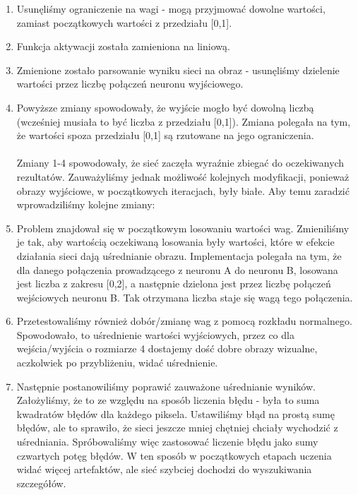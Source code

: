 \documentclass[12pt,a4paper,oneside]{article}
\begin{document}
\begin{enumerate}
\item Usunęliśmy ograniczenie na wagi - mogą przyjmować dowolne wartości, zamiast początkowych wartości z przedziału [0,1]. 
\item Funkcja aktywacji została zamieniona na liniową. 
\item Zmienione zostało parsowanie wyniku sieci na obraz - usunęliśmy dzielenie wartości przez liczbę połączeń neuronu wyjściowego.
\item Powyższe zmiany spowodowały, że wyjście mogło być dowolną liczbą (wcześniej musiała to być liczba z przedziału [0,1]). Zmiana polegała na tym, że wartości spoza przedziału [0,1] są rzutowane na jego ograniczenia.
\\ \\
Zmiany 1-4 spowodowały, że sieć zaczęła wyraźnie zbiegać do oczekiwanych rezultatów. Zauważyliśmy jednak możliwość kolejnych modyfikacji, ponieważ obrazy wyjściowe, w początkowych iteracjach, były białe. Aby temu zaradzić wprowadziliśmy kolejne zmiany:
\\
\item Problem znajdował się w początkowym losowaniu wartości wag. Zmieniliśmy je tak, aby wartością oczekiwaną losowania były wartości, które w efekcie działania sieci dają uśrednianie obrazu. Implementacja polegała na tym, że dla danego połączenia prowadzącego z neuronu A do neuronu B, losowana jest liczba z zakresu [0,2], a następnie dzielona jest przez liczbę połączeń wejściowych neuronu B. Tak otrzymana liczba staje się wagą tego połączenia.

\item Przetestowaliśmy również dobór/zmianę wag z pomocą rozkładu normalnego. Spowodowało, to uśrednienie wartości wyjściowych, przez co dla wejścia/wyjścia o rozmiarze 4 dostajemy dość dobre obrazy wizualne, aczkolwiek po przybliżeniu, widać uśrednienie.

\item Następnie postanowiliśmy poprawić zauważone uśrednianie wyników. Założyliśmy, że to ze względu na sposób liczenia błędu - była to suma kwadratów błędów dla każdego piksela. Ustawiliśmy błąd na prostą sumę błędów, ale to sprawiło, że sieci jeszcze mniej chętniej chciały wychodzić z uśredniania. Spróbowaliśmy więc zastosować liczenie błędu jako sumy czwartych potęg błędów. W ten sposób w początkowych etapach uczenia widać więcej artefaktów, ale sieć szybciej dochodzi do wyszukiwania szczegółów.
\end{enumerate}
\end{document}
